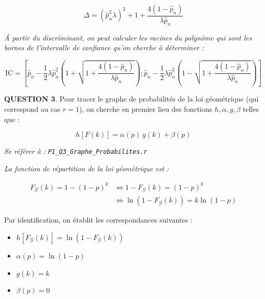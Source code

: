 \documentclass[a4paper,11pt]{article}
\newcommand{\quest}[1]{\small\textbf{#1}\normalsize}
\theoremstyle{nonumberplain}
\theoremstyle{nonumberplain}
\theoremstyle{nonumberplain}
\begin{document}
\begin{calculs}
        \[
            \Delta = (\hat{p}_n^2 \lambda)^2 + 1 + \frac{4(1 - \hat{p}_n)}{\lambda \hat{p}_n}
        \]

        \emph{\'{A} partir du discriminant, on peut calculer les racines du polynôme qui sont
        les bornes de l'intervalle de confiance qu'on cherche à déterminer :}

        \[
            \text{IC} = \left[ \hat{p}_n - \frac{1}{2} \lambda \hat{p}_n^2 \left( 1 + \sqrt{1 + \frac{4(1 - \hat{p}_n)}{\lambda \hat{p}_n}} \right) ;
            \hat{p}_n - \frac{1}{2} \lambda \hat{p}_n^2 \left( 1 - \sqrt{1 + \frac{4(1 - \hat{p}_n)}{\lambda \hat{p}_n}} \right) \right]
        \]
    \end{calculs}

    \bigskip
    \bigskip
    \quest{QUESTION 3}. Pour tracer le graphe de probabilités de la loi
    géométrique (qui correspond au cas $r = 1$), on cherche en premier lieu des
    fonctions $h, \alpha, g, \beta$ telles que :

      \[
          h[F(k)] = \alpha(p)\ g(k) + \beta(p)
      \]

      \begin{ref_r}
          \emph{Se référer à :} \texttt{\emph{P1\_Q3\_Graphe\_Probabilites.r}}
      \end{ref_r}

      \vspace{-2ex}
      \begin{calculs}
          \emph{La fonction de répartition de la loi géométrique est :}

          \vspace{-2ex}
          \begin{equation*}
          \begin{split}
              F_\mathcal{G}(k) = 1 - (1 - p)^k & \iff 1 - F_\mathcal{G}(k) = (1 - p)^k \\
                                               & \iff \ln(1 - F_\mathcal{G}(k)) = k \ln(1 - p)
          \end{split}
          \end{equation*}
      \end{calculs}

        Par identification, on établit les correspondances suivantes :
        \medskip
        \begin{itemize}
            \item $h[F_\mathcal{G}(k)] = \ln(1 - F_\mathcal{G}(k))$
            \item $\alpha(p) = \ln(1 - p)$
            \item $g(k) = k$
            \item $\beta(p) = 0$
        \end{itemize}
\end{document}
